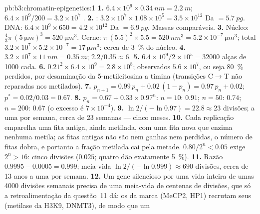 \begin{solution}{pb:b3:chromatin-epigenetics:1}
\textbf{1.} $6.4\times 10^{9}\times \qty{0.34}{nm} = \qty{2.2}{m}$;
$6.4\times 10^{9}/200 = 3.2\times 10^{7}$ .
\textbf{2.} : $3.2\times 10^{7}\times 1.08\times 10^{5} =
3.5\times 10^{12}$ Da $= \qty{5.7}{pg}$. DNA: $6.4\times 10^{9}\times
650 = 4.2\times 10^{12}$ Da $= \qty{6.9}{pg}$. Massas comparáveis.
\textbf{3.} Núcleo: $\tfrac{4}{3}\pi\,(\qty{5}{\micro m})^{3} =
\qty{520}{\micro m^3}$. Cerne: $\pi\,(5.5)^{2}\times 5.5 =
\qty{520}{nm^3} = 5.2\times 10^{-7}\,\unit{\micro m^3}$; total
$3.2\times 10^{7}\times 5.2\times 10^{-7} = \qty{17}{\micro m^3}$:
cerca de \qty{3}{\%} do núcleo.
\textbf{4.} $3.2\times 10^{7}\times \qty{11}{nm} = \qty{0.35}{m}$;
 $2.2/0.35 \approx 6$.
\textbf{5.} $6.4\times 10^{9}/2\times 10^{5} = \num{32000}$ alças de
\num{1000}  cada.
\textbf{6.} $0.21^{2}\times 6.4\times 10^{9} = 2.8\times 10^{8}$;
observados $5.6\times 10^{7}$, ou seja \qty{80}{\%} perdidos, por
desaminação da 5-metilcitosina a timina (transições C$\to$T não
reparadas nos  metilados).
\textbf{7.} $p_{n+1} = 0.99\,p_{n} + 0.02\,(1 - p_{n}) = 0.97\,p_{n} +
0.02$; $p^{*} = 0.02/0.03 = 0.67$.
\textbf{8.} $p_{n} = 0.67 + 0.33\times 0.97^{n}$: $n = 10$: $0.91$;
$n = 50$: $0.74$; $n = 200$: $0.67$ (o excesso é $7\times 10^{-4}$).
\textbf{9.} $\ln 2/(-\ln 0.97) = 22.8 \approx 23$ divisões; a uma por
semana, cerca de \num{23} semanas --- cinco meses.
\textbf{10.} Cada replicação emparelha uma fita antiga, ainda metilada,
com uma fita nova que enzima nenhuma metila; as fitas antigas não são
nem ganhas nem perdidas, o número de fitas dobra, e portanto a fração
metilada cai pela metade. $0.80/2^{n} < 0.05$ exige $2^{n} > 16$: cinco
divisões ($0.025$; quatro dão exatamente \qty{5}{\%}).
\textbf{11.} Razão $0.9995 - 0.0005 = 0.999$; meia-vida $\ln
2/(-\ln 0.999) \approx 690$ divisões, cerca de \num{13} anos a uma por
semana.
\textbf{12.} Um gene silencioso por uma vida inteira de umas \num{4000}
divisões semanais precisa de uma meia-vida de centenas de divisões, que
só a retroalimentação da questão~11 dá: os  da marca (MeCP2,
HP1) recrutam seus  (metilase da H3K9, DNMT3), de modo que um

\end{solution}
